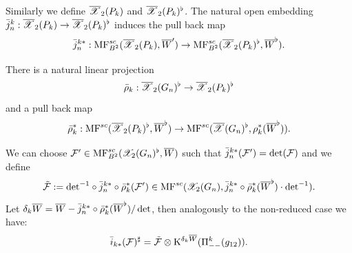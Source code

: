 Similarly we define  $\overline{\mathscr{X}}_2(P_{k})$ and $\overline{\mathscr{X}}_2(P_{k})^\flat$.
  The natural open embedding $\bar{j}^k_n: \overline{\mathscr{X}}_2(P_{k})\to \overline{\mathscr{X}}_2(P_{k})^\flat$
  induces the pull back map $$\bar{j}^{k*}_n: \mathrm{MF}^{sc}_{B^2}(\overline{\mathscr{X}}_2(P_k),\overline{W}')\to \mathrm{MF}^{sc}_{B^2}(\overline{\mathscr{X}}_2(P_{k})^\flat,\overline{W}^\flat).$$
  
 There is a natural linear projection $$\bar{\rho}_k: \overline{\mathscr{X}}_2(G_n)^\flat\to \overline{\mathscr{X}}_2(
P_{k})^\flat$$ and
 a pull back map $$\bar{\rho}_k^*: \mathrm{MF}^{sc}(\overline{\mathscr{X}}_2(P_{k})^\flat,\overline{W}^\flat)\to \mathrm{MF}^{sc}(\overline{\mathscr{X}}(G_n)^\flat,\rho_{k}^*(\overline{W}^\flat)).$$


 We can choose $\mathcal{F}'\in \mathrm{MF}^{sc}_{B^2}(\mathscr{X}_2(G_n)^\flat,\overline{W})$ such that $\bar{j}^{k*}_n(\mathcal{F}')=\det(\mathcal{F})$
 and we define
 \[\tilde{\mathcal{F}}:=\mathrm{det}^{-1}\circ\bar{j}^{k*}_n\circ \bar{\rho}_{k}^*(\mathcal{F}')\in \mathrm{MF}^{sc}(\mathscr{X}_2(G_n),\bar{j}_n^{k*}\circ\bar{\rho}_{k}^*(\overline{W}^\flat)\cdot\mathrm{det}^{-1}).\]
Let $\delta_k\overline{W}=\overline{W}-\bar{j}_n^{k*}\circ\bar{\rho}_k^*(\overline{W}^\flat)/\det$, then analogously to the non-reduced case we have:
%
$$ \bar{i}_{k*}(\mathcal{F})^\sharp=\tilde{\mathcal{F}}\otimes \mathrm{K}^{\delta_k\overline{W}} (\Pi_{--}^{k}(g_{12})).$$


